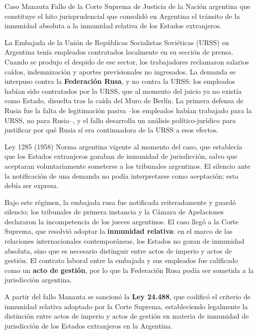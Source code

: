 \documentclass[12pt,oneside]{book}
\begin{document}
\begin{definicion}{Caso Manauta}
Fallo de la Corte Suprema de Justicia de la Nación argentina que constituye el hito jurisprudencial que consolidó en Argentina el tránsito de la inmunidad absoluta a la inmunidad relativa de los Estados extranjeros.
\end{definicion}

La Embajada de la Unión de Repúblicas Socialistas Soviéticas (URSS) en Argentina tenía empleados contratados localmente en su sección de prensa. Cuando se produjo el despido de ese sector, los trabajadores reclamaron salarios caídos, indemnización y aportes previsionales no ingresados. La demanda se interpuso contra la \textbf{Federación Rusa}, y no contra la URSS: los empleados habían sido contratados por la URSS, que al momento del juicio ya no existía como Estado, disuelta tras la caída del Muro de Berlín. La primera defensa de Rusia fue la falta de legitimación pasiva --los empleados habían trabajado para la URSS, no para Rusia--, y el fallo desarrolla un análisis político-jurídico para justificar por qué Rusia sí era continuadora de la URSS a esos efectos.

\begin{normacitada}{Ley 1285 (1958)}
Norma argentina vigente al momento del caso, que establecía que los Estados extranjeros gozaban de inmunidad de jurisdicción, salvo que aceptaran voluntariamente someterse a los tribunales argentinos. El silencio ante la notificación de una demanda no podía interpretarse como aceptación; esta debía ser expresa.
\end{normacitada}

Bajo este régimen, la embajada rusa fue notificada reiteradamente y guardó silencio; los tribunales de primera instancia y la Cámara de Apelaciones declararon la incompetencia de los jueces argentinos. El caso llegó a la Corte Suprema, que resolvió adoptar la \textbf{inmunidad relativa}: en el marco de las relaciones internacionales contemporáneas, los Estados no gozan de inmunidad absoluta, sino que es necesario distinguir entre actos de imperio y actos de gestión. El contrato laboral entre la embajada y sus empleados fue calificado como un \textbf{acto de gestión}, por lo que la Federación Rusa podía ser sometida a la jurisdicción argentina.

A partir del fallo Manauta se sancionó la \textbf{Ley 24.488}, que codificó el criterio de inmunidad relativa adoptado por la Corte Suprema, estableciendo legalmente la distinción entre actos de imperio y actos de gestión en materia de inmunidad de jurisdicción de los Estados extranjeros en la Argentina.
\end{document}

